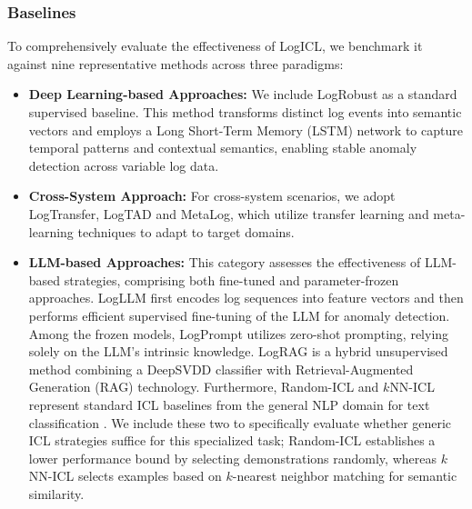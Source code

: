 \documentclass[lettersize,journal]{IEEEtran}
\begin{document}
\subsubsection{Baselines}
To comprehensively evaluate the effectiveness of LogICL, we benchmark it against nine representative methods across three paradigms:
\begin{itemize}
    \item \textbf{Deep Learning-based Approaches:} We include LogRobust \cite{zhang2019robust} as a standard supervised baseline. This method transforms distinct log events into semantic vectors and employs a Long Short-Term Memory (LSTM) network to capture temporal patterns and contextual semantics, enabling stable anomaly detection across variable log data. 
    \item \textbf{Cross-System Approach:} For cross-system scenarios, we adopt LogTransfer\cite{chen2020logtransfer}, LogTAD\cite{han2021unsupervised} and MetaLog\cite{zhang2024metalog}, which utilize transfer learning and meta-learning techniques to adapt to target domains.
    \item \textbf{LLM-based Approaches:} This category assesses the effectiveness of LLM-based strategies, comprising both fine-tuned and parameter-frozen approaches. LogLLM first encodes log sequences into feature vectors and then performs efficient supervised fine-tuning of the LLM for anomaly detection. Among the frozen models, LogPrompt utilizes zero-shot prompting, relying solely on the LLM's intrinsic knowledge. LogRAG \cite{zhang2024lograg} is a hybrid unsupervised method combining a DeepSVDD classifier with Retrieval-Augmented Generation (RAG) technology. Furthermore, Random-ICL and $k$NN-ICL represent standard ICL baselines from the general NLP domain for text classification \cite{qin2024context, peng2024revisiting}. We include these two to specifically evaluate whether generic ICL strategies suffice for this specialized task; Random-ICL establishes a lower performance bound by selecting demonstrations randomly, whereas $k$NN-ICL selects examples based on $k$-nearest neighbor matching for semantic similarity.
\end{itemize}

\end{document}
